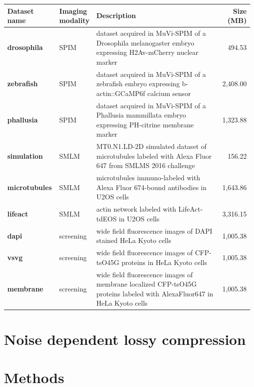     \begin{table}[tbp]
      \begin{small}
        \renewcommand{\arraystretch}{2}
        \centering
        \begin{tabular}{llp{7cm}r}
          \textbf{Dataset name} & \parbox[c]{2cm}{\textbf{Imaging\\modality}} & \textbf{Description} & \textbf{Size (MB)} \\
          \hline
          \hline
          \textbf{drosophila} & SPIM & dataset acquired in MuVi-SPIM of a Drosophila melanogaster embryo expressing H2Av-mCherry nuclear marker & 494.53 \\ \hline
          \textbf{zebrafish} & SPIM & dataset acquired in MuVi-SPIM of a zebrafish embryo expressing b-actin::GCaMP6f calcium sensor & 2,408.00 \\ \hline
          \textbf{phallusia} & SPIM & dataset acquired in MuVi-SPIM of a Phallusia mammillata embryo expressing PH-citrine membrane marker & 1,323.88  \\ \hline
          \textbf{simulation} & SMLM & MT0.N1.LD-2D simulated dataset of microtubules labeled with Alexa Fluor 647 from SMLMS 2016 challenge & 156.22 \\ \hline
          \textbf{microtubules} & SMLM & microtubules immuno-labeled with Alexa Fluor 674-bound antibodies in U2OS cells & 1,643.86  \\ \hline
          \textbf{lifeact} & SMLM & actin network labeled with LifeAct-tdEOS in U2OS cells & 3,316.15  \\ \hline
          \textbf{dapi} & screening & wide field fluorescence images of DAPI stained HeLa Kyoto cells \cite{simpson_genome-wide_2012} & 1,005.38 \\ \hline
          \textbf{vsvg} & screening & wide field fluorescence images of CFP-tsO45G proteins in HeLa Kyoto cells \cite{simpson_genome-wide_2012} & 1,005.38  \\ \hline
          \textbf{membrane} & screening & wide field fluorescence images of membrane localized CFP-tsO45G proteins labeled with AlexaFluor647 in HeLa Kyoto cells \cite{simpson_genome-wide_2012} & 1,005.38  \\ 
        \end{tabular}
        \label{tab:datasets}
      \end{small}
    \end{table}

\section{Noise dependent lossy compression}

\section{Methods}
